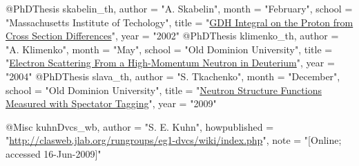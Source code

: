 @PhDThesis{ skabelin_th,
	author = "A. Skabelin",
	month = "February",
	school = "Massachusetts Institute of Techology",
	title = "\href{www.jlab.org/Hall-B/general/thesis/skabelin\_thesis.ps‎}{GDH Integral on the Proton from Cross Section Differences}",
	year = "2002"
}
@PhDThesis{ klimenko_th,
	author = "A. Klimenko",
	month = "May",
	school = "Old Dominion University",
	title = "\href{https:\//www.jlab.org/Hall-B/general/clas\_thesis.html}{Electron Scattering From a High-Momentum Neutron in Deuterium}",
	year = "2004"
}
@PhDThesis{ slava_th,
	author = "S. Tkachenko",
	month = "December",
	school = "Old Dominion University",
	title = "\href{https://www.jlab.org/Hall-B/general/thesis/Tkachenko\_thesis.pdf}{Neutron Structure Functions Measured with Spectator Tagging}",
	year = "2009"
}

@Misc{ kuhnDvcs_wb,
  author = "S. E. Kuhn",
  howpublished = "\url{http://clasweb.jlab.org/rungroups/eg1-dvcs/wiki/index.php}", 
  note = "[Online; accessed 16-Jun-2009]"
} 

